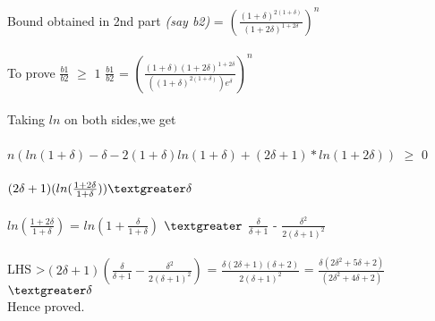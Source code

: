 \documentclass{article}
\begin{document}
Bound obtained in 2nd part \textit{(say b2)} = $(\frac{(1+\delta)^{2(1+\delta)}}{(1+2\delta)^{1+2\delta}})^{n}$ \\\\
To prove $\frac{b1}{b2}$ $\geq$ $1$
$\frac{b1}{b2}$ = $(\frac{(1+\delta)(1+2\delta)^{1+2\delta}}{((1+\delta)^{2(1+\delta)})e^{\delta}})^{n}$ \\\\
Taking $ln$ on both sides,we get \\\\
$n(ln(1+\delta) - \delta - 2(1+\delta)ln(1+\delta) + (2\delta + 1)*ln(1+2\delta))$ $\geq$ 0 \\\\
$(2\delta + 1)(ln(\frac{1 + 2\delta}{1 + \delta})) \textgreater \delta$ \\\\
$ln(\frac{1 + 2\delta}{1 + \delta})$ = $ln(1+\frac{\delta}{1+\delta})$ $\textgreater$ $\frac{\delta}{\delta + 1}$ - $\frac{\delta^{2}}{2(\delta + 1)^{2}}$ \\\\
LHS \textgreater $(2\delta + 1)(\frac{\delta}{\delta + 1} - \frac{\delta^{2}}{2(\delta + 1)^{2}})$
= $\frac{\delta(2\delta + 1)(\delta + 2)}{2(\delta + 1)^{2}}$
= $\frac{\delta(2\delta^{2} + 5\delta + 2)}{(2\delta^{2} + 4\delta + 2)}$
$\textgreater \delta $ \\
Hence proved. \\\\
\end{document}
